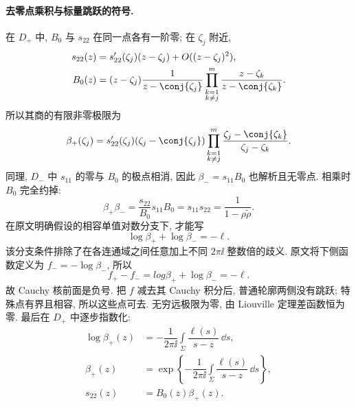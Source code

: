 \paragraph{去零点乘积与标量跳跃的符号.}
在 $D_+$ 中, $B_0$ 与 $s_{22}$ 在同一点各有一阶零;
在 $\zeta_j$ 附近,
\[
\begin{aligned}
s_{22}(z)&=s_{22}'(\zeta_j)(z-\zeta_j)+O((z-\zeta_j)^2),\\
B_0(z)&=(z-\zeta_j)
\dfrac{1}{z-\conj{\zeta_j}}
\prod\limits_{\substack{k=1\\k\ne j}}^{m}
\dfrac{z-\zeta_k}{z-\conj{\zeta_k}}.
\end{aligned}
\]
所以其商的有限非零极限为
\[
\beta_+(\zeta_j)
=s_{22}'(\zeta_j)(\zeta_j-\conj{\zeta_j})
\prod\limits_{\substack{k=1\\k\ne j}}^{m}
\dfrac{\zeta_j-\conj{\zeta_k}}{\zeta_j-\zeta_k}.
\]
同理, $D_-$ 中 $s_{11}$ 的零与 $B_0$ 的极点相消,
因此 $\beta_-=s_{11}B_0$ 也解析且无零点.
相乘时 $B_0$ 完全约掉:
\[
\beta_+\beta_-
=\dfrac{s_{22}}{B_0}s_{11}B_0
=s_{11}s_{22}
=\dfrac{1}{1-\rho\widetilde\rho}.
\]
在原文明确假设的相容单值对数分支下, 才能写
\[
\log\beta_++\log\beta_-=-\ell.
\]
该分支条件排除了在各连通域之间任意加上不同 $2\pi\ii$ 整数倍的歧义.
原文将下侧函数定义为 $f_-=-\log\beta_-$, 所以
\[
f_+-f_-=log\beta_++\log\beta_-=-\ell.
\]
故 Cauchy 核前面是负号.
把 $f$ 减去其 Cauchy 积分后, 普通轮廓两侧没有跳跃;
特殊点有界且相容, 所以这些点可去.
无穷远极限为零, 由 Liouville 定理差函数恒为零.
最后在 $D_+$ 中逐步指数化:
\[
\begin{aligned}
\log\beta_+(z)
&=-\dfrac{1}{2\pi\ii}\int\limits_\Sigma
\dfrac{\ell(s)}{s-z}\,\dd s,\\
\beta_+(z)
&=\exp\left\{-\dfrac{1}{2\pi\ii}\int\limits_\Sigma
\dfrac{\ell(s)}{s-z}\,\dd s\right\},\\
s_{22}(z)&=B_0(z)\beta_+(z).
\end{aligned}
\]

